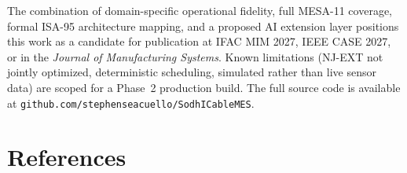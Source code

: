 \documentclass[11pt]{article}
\begin{document}
The combination of domain-specific operational fidelity, full MESA-11 coverage, formal ISA-95 architecture mapping, and a proposed AI extension layer positions this work as a candidate for publication at IFAC MIM 2027, IEEE CASE 2027, or in the \textit{Journal of Manufacturing Systems}.  Known limitations (NJ-EXT not jointly optimized, deterministic scheduling, simulated rather than live sensor data) are scoped for a Phase~2 production build.  The full source code is available at \texttt{github.com/stephenseacuello/SodhICableMES}.


\section*{References}
\end{document}
